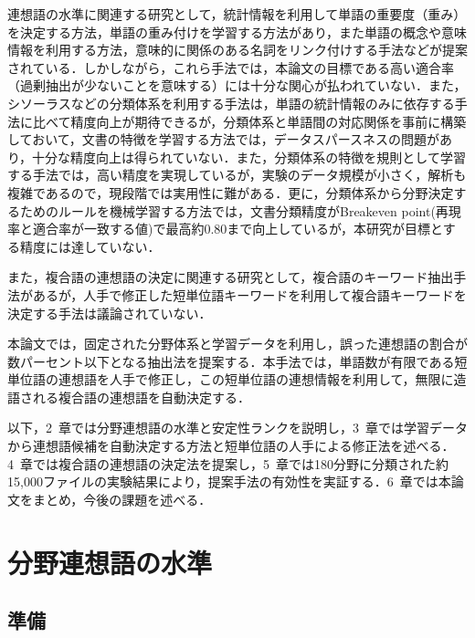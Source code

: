 連想語の水準に関連する研究として，統計情報を利用して単語の重要度（重み）を決定する方法\cite{Salton1988,Salton1983,Salton1973,徳永他1994}，単語の重み付けを学習する方法\cite{福本他1999}があり，また単語の概念や意味情報を利用する方法\cite{亀田他1987,Walker1987}，意味的に関係のある名詞をリンク付けする手法\cite{福本他1996}などが提案されている．しかしながら，これら手法では，本論文の目標である高い適合率（過剰抽出が少ないことを意味する）には十分な関心が払われていない．また，シソーラスなどの分類体系を利用する手法は，単語の統計情報のみに依存する手法に比べて精度向上が期待できるが，分類体系と単語間の対応関係を事前に構築しておいて，文書の特徴を学習する方法\cite{河合1992,山本他1995}では，データスパースネス\cite{福本他1996}の問題があり，十分な精度向上は得られていない．また，分類体系の特徴を規則として学習する手法\cite{Blosseville1992}では，高い精度を実現しているが，実験のデータ規模が小さく，解析も複雑であるので，現段階では実用性に難がある．更に，分類体系から分野決定するためのルールを機械学習する方法\cite{Apte1994}では，文書分類精度がBreakeven point(再現率と適合率が一致する値)で最高約0.80まで向上しているが，本研究が目標とする精度には達していない．

また，複合語の連想語の決定に関連する研究として，複合語のキーワード抽出手法\cite{伊藤他1993,小川他1993,林他1997,原他1997}があるが，人手で修正した短単位語キーワードを利用して複合語キーワードを決定する手法は議論されていない．

本論文では，固定された分野体系と学習データを利用し，誤った連想語の割合が数パーセント以下となる抽出法を提案する．本手法では，単語数が有限である短単位語の連想語を人手で修正し，この短単位語の連想情報を利用して，無限に造語される複合語の連想語を自動決定する．

以下，2~章では分野連想語の水準と安定性ランクを説明し，3~章では学習データから連想語候補を自動決定する方法と短単位語の人手による修正法を述べる．4~章では複合語の連想語の決定法を提案し，5~章では180分野に分類された約15,000ファイルの実験結果により，提案手法の有効性を実証する．6~章では本論文をまとめ，今後の課題を述べる．
\vspace{-2mm}
\section{分野連想語の水準}
\vspace{-2mm}
\subsection{準備}


